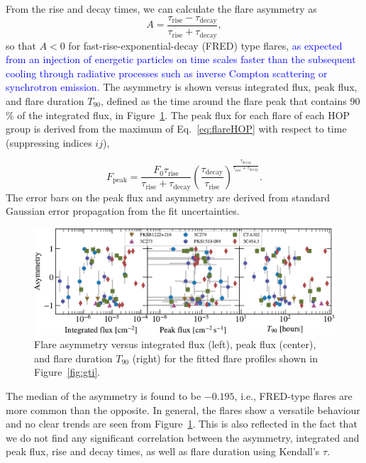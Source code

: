 \documentclass[twocolumn,linenumbers]{aastex62}
\newcommand{\response}[1]{\textcolor{blue}{#1}}
\begin{document}
From the rise and decay times, we can calculate the flare asymmetry as
\begin{equation}
    A = \frac{\tau_\mathrm{rise}-\tau_\mathrm{decay}}
    {\tau_\mathrm{rise}+\tau_\mathrm{decay}},
\end{equation}
so that $A < 0$ for fast-rise-exponential-decay (FRED) type flares, 
\response{
as expected from an injection of energetic particles on time scales faster than the subsequent cooling through radiative processes such as inverse Compton scattering or synchrotron emission.
}
The asymmetry is shown versus integrated flux, peak flux, and flare duration $T_{90}$, defined as the time around the flare peak that contains 90\,\% of the integrated flux, in Figure~\ref{fig:asym}.
The peak flux for each flare of each HOP group is derived from the maximum of  Eq.~\ref{eq:flareHOP} with respect to time (suppressing indices $ij$),

\begin{equation}
    F_{\mathrm{peak}} = \frac{F_{0} \tau_\mathrm{rise}}{\tau_\mathrm{rise} + \tau_\mathrm{decay}}\left(\frac{\tau_\mathrm{decay}}{\tau_\mathrm{rise}}\right)^{\frac{\tau_\mathrm{decay}}{\tau_\mathrm{rise} + \tau_\mathrm{decay}}}.
\end{equation}
The error bars on the peak flux and asymmetry are derived from standard Gaussian error propagation from the fit uncertainties.

\begin{figure}
    \centering
    \includegraphics[width = .8\linewidth]{lcfithop_results_asym_vs_all_orbit_maxiter2_fsys0p00_addcomp0.pdf}
    \caption{Flare asymmetry versus integrated flux (left), peak flux (center), and flare duration $T_{90}$ (right) for the fitted flare profiles shown in Figure~\ref{fig:gti}.}
    \label{fig:asym}
\end{figure}

The median of the asymmetry is found to be $-0.195$, i.e., FRED-type flares are more common than the opposite. In general, the flares show a versatile behaviour and no clear trends are seen from Figure~\ref{fig:asym}. This is also reflected in the fact that we do not find any significant correlation between the asymmetry, integrated and peak flux, rise and decay times, as well as flare duration using Kendall's $\tau$.
\end{document}
